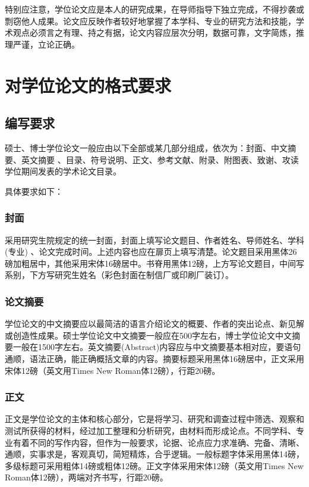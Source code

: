 特别应注意，学位论文应是本人的研究成果，在导师指导下独立完成，不得抄袭或剽窃他人成果。论文应反映作者较好地掌握了本学科、专业的研究方法和技能，学术观点必须言之有理、持之有据，论文内容应层次分明，数据可靠，文字简炼，推理严谨，立论正确。

\section{对学位论文的格式要求}

\subsection{编写要求}

硕士、博士学位论文一般应由以下全部或某几部分组成，依次为：封面、中文摘要、英文摘要 、目录、符号说明、正文、参考文献、附录、附图表、致谢、攻读学位期间发表的学术论文目录。

具体要求如下：

\subsubsection{封面}

采用研究生院规定的统一封面，封面上填写论文题目、作者姓名、导师姓名、学科(专业) 、论文完成时间。上述内容也应在扉页上填写清楚。论文题目采用黑体26磅加粗居中，其他采用宋体16磅居中。书脊用黑体12磅，上方写论文题目，中间写系别，下方写研究生姓名（彩色封面在制信厂或印刷厂装订）。

\subsubsection{论文摘要}

学位论文的中文摘要应以最简洁的语言介绍论文的概要、作者的突出论点、新见解或创造性成果。硕士学位论文中文摘要一般应在500字左右，博士学位论文中文摘要一般在1500字左右。英文摘要(Abstract)内容应与中文摘要基本相对应，要语句通顺，语法正确，能正确概括文章的内容。摘要标题采用黑体16磅居中，正文采用宋体12磅（英文用Times New Roman体12磅），行距20磅。

\subsubsection{正文}

正文是学位论文的主体和核心部分，它是将学习、研究和调查过程中筛选、观察和测试所获得的材料，经过加工整理和分析研究，由材料而形成论点。不同学科、专业有着不同的写作内容，但作为一般要求，论据、论点应力求准确、完备、清晰、通顺，实事求是，客观真切，简短精炼，合乎逻辑。一般标题字体采用黑体14磅，多级标题可采用粗体14磅或粗体12磅。正文字体采用宋体12磅（英文用Times New Roman体12磅），两端对齐书写，行距20磅。


